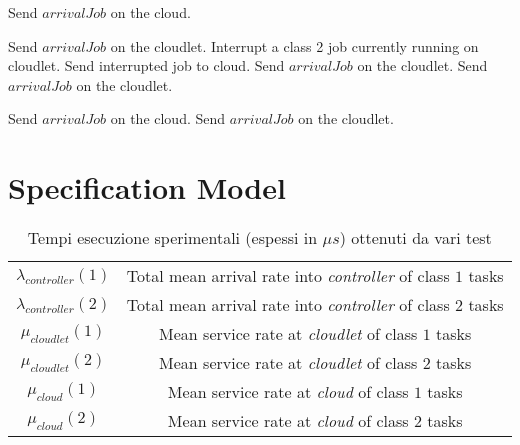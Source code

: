\documentclass[10pt,a4paper]{article}
\begin{document}
\begin{algorithm}
\caption{}\label{alg:accessControlAlgorithm2}
\begin{algorithmic}[1]




	\State Send $\textit{arrivalJob}$ on the cloud.

	\State Send $\textit{arrivalJob}$ on the cloudlet.
	\State Interrupt a class 2 job currently running on cloudlet.
	\State Send interrupted job to cloud.
	\State Send $\textit{arrivalJob}$ on the cloudlet.
\Else 	
 	\State Send $\textit{arrivalJob}$ on the cloudlet.
\EndIf



\Else 

	\State Send $\textit{arrivalJob}$ on the cloud.
\Else 	
 	\State Send $\textit{arrivalJob}$ on the cloudlet.
\EndIf

\EndIf

\EndFunction

\end{algorithmic}
\end{algorithm}

















\newpage
\section{Specification  Model}



\begin{table}
\caption{Tempi esecuzione sperimentali (espessi in $\mu s$) ottenuti da vari test}\label{table:diana}
\begin{center}
\begin{tabular}{cc}

\toprule

$\lambda_{controller}(1)$ & Total mean arrival rate into \textit{controller} of class $1$ tasks \\
$\lambda_{controller}(2)$ & Total mean arrival rate into \textit{controller} of class $2$ tasks \\
$\mu_{cloudlet}(1)$ & Mean service rate at \textit{cloudlet} of class $1$ tasks \\
$\mu_{cloudlet}(2)$ & Mean service rate at \textit{cloudlet} of class $2$ tasks \\
$\mu_{cloud}(1)$ & Mean service rate at \textit{cloud} of class $1$ tasks \\
$\mu_{cloud}(2)$ & Mean service rate at \textit{cloud} of class $2$ tasks \\
\end{tabular}
\end{center}
\end{table}
\end{document}
